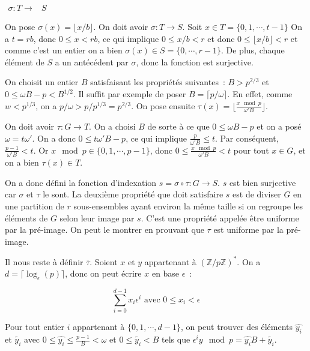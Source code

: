 		$\begin{array}{lrcl}
		\sigma : T \longrightarrow & S
		\end{array}$
		
		On pose $\sigma(x) = \lfloor x/b \rfloor$. On doit avoir $\sigma : T \longrightarrow S$. Soit $x \in T = \{0,1,\cdots,t-1\}$ On a $t = rb$, donc $0 \leq x < rb$, ce qui implique $0 \leq x/b < r$ et donc $0 \leq \lfloor x/b \rfloor < r$ et comme c'est un entier on a bien $\sigma(x) \in S=\{0,\cdots,r-1\}$. De plus, chaque élément de $S$ a un antécédent par $\sigma$, donc la fonction est surjective.
		
		On choisit un entier $B$ satisfaisant les propriétés suivantes~:  $B > p^{2/3}$ et $0 \leq \omega B - p < B^{1/2}$. Il suffit par exemple de poser $B = \lceil p/\omega \rceil$. En effet, comme $w < p^{1/3}$, on a $p/\omega > p/p^{1/3} = p^{2/3}$. On pose ensuite $\tau(x) = \lfloor \frac{x\mod p}{\omega' B} \rfloor$.
		
		On doit avoir $\tau : G \longrightarrow T$. On a choisi $B$ de sorte à ce que $0 \leq \omega B - p$ et on a posé $\omega = t\omega'$. On a donc $0 \leq t \omega' B - p$, ce qui implique $\frac{p}{\omega' B} \leq t$. Par conséquent, $\frac{p-1}{\omega' B} < t$. Or $x\mod p \in \{0,1,\cdots,p-1\}$, donc $0 \leq \frac{x\mod p}{\omega' B} < t$ pour tout $x \in G$, et on a bien $\tau(x) \in T$.
		
		On a donc défini la fonction d'indexation $s = \sigma \circ \tau : G \longrightarrow S$. $s$ est bien surjective car $\sigma$ et $\tau$ le sont. La deuxième propriété que doit satisfaire $s$ est de diviser $G$ en une partition de $r$ sous-ensembles ayant environ la même taille si on regroupe les éléments de $G$ selon leur image par $s$. C'est une propriété appelée être uniforme par la pré-image. On peut le montrer en prouvant que $\tau$ est uniforme par la pré-image.
		
		Il nous reste à définir $\overline{\tau}$. Soient $x$ et $y$ appartenant à $(\mathbb{Z}/p\mathbb{Z})^*$. On a $d = \lceil\log_\epsilon(p)\rceil$, donc on peut écrire $x$ en base $\epsilon$~:
		
		$$ \sum_{i=0}^{d-1} x_i \epsilon^i \text{ avec $0 \leq x_i < \epsilon$} $$
		
		Pour tout entier $i$ appartenant à $\{0,1,\cdots,d-1\}$, on peut trouver des éléments $\hat{y_i}$ et $\tilde{y_i}$ avec $0 \leq \hat{y_i} \leq \frac{p-1}{B} < \omega$ et $0 \leq \tilde{y_i} < B$ tels que $\epsilon^i y\mod p = \hat{y_i} B + \tilde{y_i}$.
		
